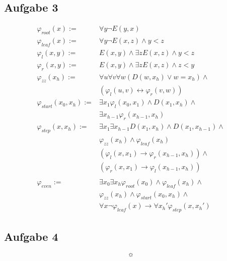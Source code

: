 \documentclass[12pt]{article}
\begin{document}
\subsection*{Aufgabe 3}

\begin{align}
  \varphi_{root}(x) :=& \forall y \neg E(y,x) \\
  \varphi_{leaf}(x) :=& \forall y \neg E(x,z) \land y<z \\
  \varphi_{l}(x,y) :=& E(x,y)\land \exists z E(x,z)\land y<z\\
  \varphi_{r}(x,y) :=& E(x,y)\land \exists z E(x,z)\land z<y\\
  \varphi_{zz}(x_h) :=& \forall u\forall v\forall w (D(w,x_h)\lor w=x_h) \land\\
                      &(\varphi_l(u,v)\leftrightarrow \varphi_r(v,w)) \\
  \varphi_{start}(x_0, x_h) :=& \exists x_1 \varphi_l(x_0, x_1) \land D(x_1,x_h) \land\\
  &\exists x_{h-1} \varphi_r(x_{h-1},x_h) \\
  \varphi_{step}(x,x_h):=&\exists x_1 \exists x_{h-1} D(x_1,x_h) \land D(x_1, x_{h-1})\land \\ 
  &\varphi_{zz}(x_h) \land \varphi_{leaf}(x_h)\\
  &(\varphi_l(x,x_1) \rightarrow \varphi_r(x_{h-1}, x_h)) \land \\
  &(\varphi_r(x,x_1) \rightarrow \varphi_l(x_{h-1}, x_h)) \\ \\
  \varphi_{even} :=& \exists x_0 \exists x_h \varphi_{root}(x_0)\land \varphi_{leaf}(x_h) \land \\
  &\varphi_{zz}(x_h) \land \varphi_{start}(x_0,x_h) \land\\
  &\forall x \neg \varphi_{leaf}(x) \rightarrow \forall x_h' \varphi_{step}(x,x_h')
\end{align}

\subsection*{Aufgabe 4}
\[ \sun \]
\end{document}
